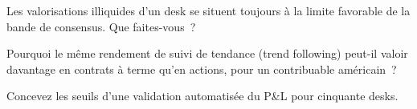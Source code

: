 \begin{interviewq}\label{iq:fm:finance-product-control-and-tax:4}
Les valorisations illiquides d'un desk se situent toujours à la limite favorable de la bande de consensus. Que faites-vous~?
\end{interviewq}

\begin{interviewq}\label{iq:fm:finance-product-control-and-tax:5}
Pourquoi le même rendement de suivi de tendance (trend following) peut-il valoir davantage en contrats à terme qu'en actions, pour un contribuable américain~?
\end{interviewq}

\begin{interviewq}\label{iq:fm:finance-product-control-and-tax:6}
Concevez les seuils d'une validation automatisée du P\&L pour cinquante desks.
\end{interviewq}
